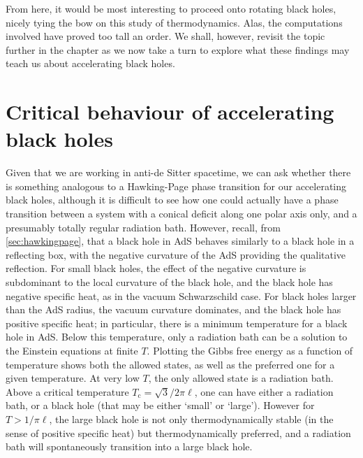 \documentclass[
twoside,
openright,
frontopenright,
]{dmathesis}
\begin{document}
From here, it would be most interesting to proceed onto rotating black holes,
nicely tying the bow on this study of thermodynamics. Alas, the computations
involved have proved too tall an order. We shall, however, revisit the topic
further in the chapter as we now take a turn to explore what these findings may
teach us about accelerating black holes.

\section{Critical behaviour of accelerating black holes}

Given that we are working in anti-de Sitter spacetime, we can ask whether there
is something analogous to a Hawking-Page phase transition \cite{Hawking:1982dh}
for our accelerating black holes, although it is difficult to see how one could
actually have a phase transition between a system with a conical deficit along
one polar axis only, and a presumably totally regular radiation bath.  However,
recall, from \cref{sec:hawkingpage}, that a black hole in AdS behaves similarly
to a black hole in a reflecting box, with the negative curvature of the AdS
providing the qualitative reflection. For small black holes, the effect of the
negative curvature is subdominant to the local curvature of the black hole, and
the black hole has negative specific heat, as in the vacuum Schwarzschild
case. For black holes larger than the AdS radius, the vacuum curvature
dominates, and the black hole has positive specific heat; in particular, there
is a minimum temperature for a black hole in AdS. Below this temperature, only a
radiation bath can be a solution to the Einstein equations at finite
$T$. Plotting the Gibbs free energy as a function of temperature shows both the
allowed states, as well as the preferred one for a given temperature.  At very
low $T$, the only allowed state is a radiation bath. Above a critical
temperature $T_\mathrm{c} = \sqrt{3}/2\pi\ell$, one can have either a radiation bath, or
a black hole (that may be either `small' or `large'). However for $T>1/\pi\ell$,
the large black hole is not only thermodynamically stable (in the sense of
positive specific heat) but thermodynamically preferred, and a radiation bath
will spontaneously transition into a large black hole.
\end{document}
